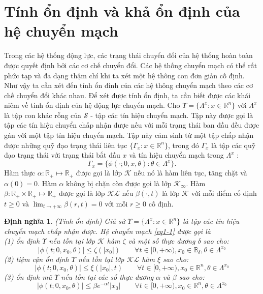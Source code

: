 \documentclass[14pt,a4paper,oneside]{report}		%
\newtheorem{define}[theorem]{Định nghĩa}
\begin{document}
\section{Tính ổn định và khả ổn định của hệ chuyển mạch}
Trong các hệ thống động lực, các trạng thái chuyển đổi của hệ thống hoàn toàn được quyết định bởi các cơ chế chuyển đổi. Các hệ thống chuyển mạch có thể rất phức tạp và đa dạng thậm chí khi ta xét một hệ thông con đơn giản cố định. Như vậy ta cần xét đến tính ổn đinh của các hệ thông chuyển mạch theo các cơ chế chuyển đổi khác nhau. Để xét được tính ổn định, ta cần biết được các khái niêm về tính ổn định của hệ động lực chuyển mạch.
Cho $\Upsilon = \{\Lambda^x:x\in\mathbb{R}^n\}$ với $\Lambda^x$ là tập con khác rỗng của $\mathcal{S}$ - tập các tín hiệu chuyển mạch. Tập này được gọi là tập các tín hiệu chuyển chấp nhận được nếu với mỗi trạng thái ban đầu đều được gán với một tập tín hiệu chuyển mạch. Tập này cảm sinh từ một tập chấp nhận được những quỹ đạo trạng thái liên tục $\{\Gamma_x:x\in\mathbb{R}^n\}$, trong đó $\Gamma_x$ là tập các quỹ đạo trạng thái với trạng thái bắt đầu $x$ và tín hiệu chuyển mạch trong $\Lambda^x$ :
$$\Gamma_x = \{\phi(\cdot;0,x,\theta):\theta\in\Lambda^x\}.$$
Hàm thực $\alpha :\mathbb{R}_+ \mapsto \mathbb{R}_+$ được gọi là lớp $\mathcal{K}$ nếu nó là hàm liên tục, tăng chặt và $\alpha(0)=0$. Hàm $\alpha$ không bị chặn còn được gọi là lớp $\mathcal{K}_\infty$. Hàm $\beta : \mathbb{R}_+ \times \mathbb{R}_+ \mapsto \mathbb{R}_+$ được gọi là lớp $\mathcal{KL}$ nếu $\beta(\cdot,t)$ là lớp $\mathcal{K}$ với mỗi điểm cố định $t \geq 0$ và $\lim_{t\rightarrow +\infty}\beta(r,t)=0$ với mỗi $r\geq 0$ cố định.

\begin{define} \label{def1-1} (Tính ổn định) Giả sử $\Upsilon = \{\Lambda^x:x\in\mathbb{R}^n\}$ là tập các tín hiệu chuyển mạch chấp nhận được. Hệ chuyển mạch \ref{eq1-1} được gọi là \\
(1) ổn định $\Upsilon$ nếu tồn tại lớp $\mathcal{K}$ hàm $\zeta$ và một số thực dương $\delta$ sao cho:
$$|\phi(t;0,x_0,\theta)|\leq\zeta(|x_0|)\qquad\forall t \in [0,+\infty ), x_0 \in\mathbb{B}_\delta , \theta \in\Lambda^{x_0}$$
(2) tiệm cận ổn định $\Upsilon$ nếu tồn tại lớp $\mathcal{KL}$ hàm $\xi$ sao cho:
$$|\phi(t;0,x_0,\theta)|\leq\xi(|x_0|,t)\qquad\forall t \in [0,+\infty ), x_0 \in\mathbb{R}^n , \theta \in\Lambda^{x_0}$$
(3) ổn định mũ $\Upsilon$ nếu tồn tại các số thực dương $\alpha$ và $\beta$ sao cho:
$$|\phi(t;0,x_0,\theta)|\leq \beta e^{-\alpha t}|x_0|\qquad\forall t \in [0,+\infty ), x_0 \in\mathbb{R}^n , \theta \in\Lambda^{x_0}$$
\end{define}
\end{document}
